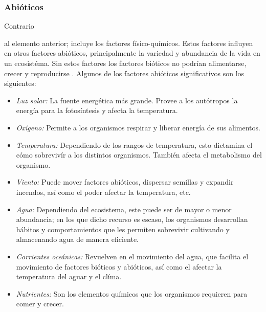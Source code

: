 \documentclass[stu, 12pt, letterpaper, donotrepeattitle, floatsintext, natbib]{apa7}
\begin{document}
\subsubsection{Abióticos}
Contrario \begin{justifying}
    al elemento anterior; incluye los factores físico-químicos. Estos factores influyen en otros factores abióticos, principalmente la variedad y abundancia de la vida en un ecosistéma. Sin estos factores
    los factores bióticos no podrían alimentarse, crecer y reproducirse \citep{spanner-no-date}. Algunos de los factores abióticos significativos son los siguientes:\par
    \begin{itemize}
        \item \emph{Luz solar:} La fuente energética más grande. Provee a los autótropos la energía para la fotosíntesis y afecta la temperatura.
        \item \emph{Oxígeno: }Permite a los organismos respirar y liberar energía de sus alimentos.
        \item \emph{Temperatura:} Dependiendo de los rangos de temperatura, esto dictamina el cómo sobrevivír a los distintos organismos. También afecta el metabolismo del organismo.
        \item \emph{Viento:} Puede mover factores abióticos, dispersar semillas y expandir incendos, así como el poder afectar la temperatura, etc.
        \item \emph{Agua:} Dependiendo del ecosistema, este puede ser de mayor o menor abundancia; en los que dicho recurso es escaso, los organismos desarrollan hábitos y comportamientos que les permiten sobrevivir cultivando y almacenando agua de manera eficiente.
        \item \emph{Corrientes oceánicas:} Revuelven en el movimiento del agua, que facilita el movimiento de factores bióticos y abióticos, así como el afectar la temperatura del aguar y el clíma.
        \item \emph{Nutrientes:} Son los elementos químicos que los organismos requieren para comer y crecer.
    \end{itemize}       
\end{justifying}
\vspace{\baselineskip}
\end{document}
